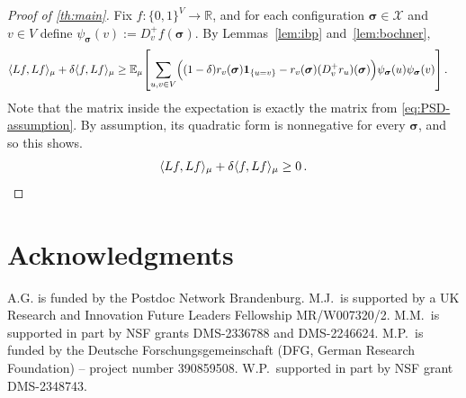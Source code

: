 \documentclass[10pt]{amsart}
\newcommand{\E}{\mathbb{E}}
\newcommand{\sigmabf}{ \boldsymbol{\sigma} }
\begin{document}
	\begin{proof}[Proof of \cref{th:main}]
		Fix $f:\{0,1\}^V\to\mathbb R$, and for each configuration $\sigmabf\in \mathcal X$ and $v\in V$ define
		\(
		\psi_{\sigmabf}(v):=D_v^+f(\sigmabf).
		\)
		By Lemmas~\ref{lem:ibp} and~\ref{lem:bochner},
		\begin{align*}
			\langle Lf,Lf\rangle_\mu+\delta\langle f,Lf\rangle_\mu
			&\ge
			\E_\mu\!\left[
			\sum_{u,v\in V}
			\Bigl(
			(1-\delta)r_v(\sigmabf)\mathbf 1_{\{u=v\}}
			-
			r_v(\sigmabf)(D_v^+r_u)(\sigmabf)
			\Bigr)
			\psi_{\sigmabf}(u)\psi_{\sigmabf}(v)
			\right].
		\end{align*}
		Note  that the matrix inside the expectation is exactly the matrix from \eqref{eq:PSD-assumption}. By
		assumption, its quadratic form is nonnegative for every $\sigmabf$, and so this shows.
		\[
		\langle Lf,Lf\rangle_\mu+ \delta\langle f,Lf\rangle_\mu \geq 0\,. \qedhere 
		\]
	\end{proof}
	
	\section*{Acknowledgments}
	A.G. is funded by the Postdoc Network Brandenburg.
	M.J.\ is supported by a UK Research and Innovation Future Leaders Fellowship MR/W007320/2.  M.M.\ is supported in part by NSF grants DMS-2336788 and DMS-2246624. 
	M.P.\ is funded by the Deutsche Forschungsgemeinschaft (DFG, German Research Foundation) -- project number 390859508.
	W.P.\ supported in part by NSF grant DMS-2348743. 
	
	
	
	
	
\end{document}
